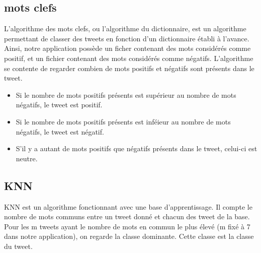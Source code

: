 \documentclass[a4paper,10pt]{report}
\begin{document}
    \subsection{mots clefs}
      L'algorithme des mots clefs, ou l'algorithme du dictionnaire, est un algorithme permettant de classer des tweets en fonction d'un dictionnaire établi à l'avance.
      Ainsi, notre application possède un ficher contenant des mots considérés comme positif, et un fichier contenant des mots considérés comme négatifs.
      L'algorithme se contente de regarder combien de mots positifs et négatifs sont présents dans le tweet.
      \begin{itemize}
       \item Si le nombre de mots positifs présents est supérieur au nombre de mots négatifs, le tweet est positif.
       \item Si le nombre de mots positifs présents est inféieur au nombre de mots négatifs, le tweet est négatif.
       \item S'il y a autant de mots positifs que négatifs présents dans le tweet, celui-ci est neutre.
      \end{itemize}

    \subsection{KNN}
      KNN est un algorithme fonctionnant avec une base d'apprentissage. Il compte le nombre de mots communs entre un tweet donné et chacun des tweet de la base.
      Pour les m tweets ayant le nombre de mots en commun le plus élevé (m fixé à 7 dans notre application), on regarde la classe dominante.
      Cette classe est la classe du tweet.
      
\end{document}

